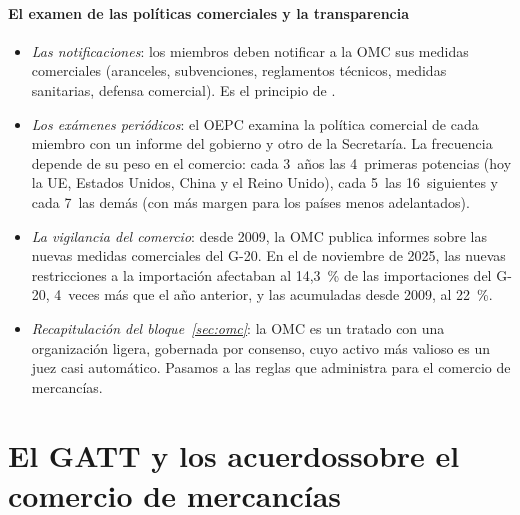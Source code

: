 \documentclass[11pt]{article}
\begin{document}
\begin{infografia}[H]
\centering
\caption{Etapas de una diferencia en la OMC y sus plazos}\label{figu:procedimiento}
\end{infografia}

\paragraph{El examen de las políticas comerciales y la transparencia}

\begin{itemize}
\item \emph{Las notificaciones}: los miembros deben notificar a la OMC sus medidas comerciales (aranceles, subvenciones, reglamentos técnicos, medidas sanitarias, defensa comercial). Es el principio de .
\item \emph{Los exámenes periódicos}: el OEPC examina la política comercial de cada miembro con un informe del gobierno y otro de la Secretaría. La frecuencia depende de su peso en el comercio: cada 3~años las 4~primeras potencias (hoy la UE, Estados Unidos, China y el Reino Unido), cada 5~las 16~siguientes y cada 7~las demás (con más margen para los países menos adelantados).
\item \emph{La vigilancia del comercio}: desde 2009, la OMC publica informes sobre las nuevas medidas comerciales del G-20. En el de noviembre de 2025, las nuevas restricciones a la importación afectaban al 14,3~\% de las importaciones del G-20, 4~veces más que el año anterior, y las acumuladas desde 2009, al 22~\%\nocite{OMC2025VigilanciaG20}.
\end{itemize}

\begin{itemize}
\item \emph{Recapitulación del bloque~\ref{sec:omc}}: la OMC es un tratado con una organización ligera, gobernada por consenso, cuyo activo más valioso es un juez casi automático. Pasamos a las reglas que administra para el comercio de mercancías.
\end{itemize}

\section{El GATT y los acuerdos\cortetitulo sobre el comercio de mercancías}\label{sec:mercancias}
\end{document}
